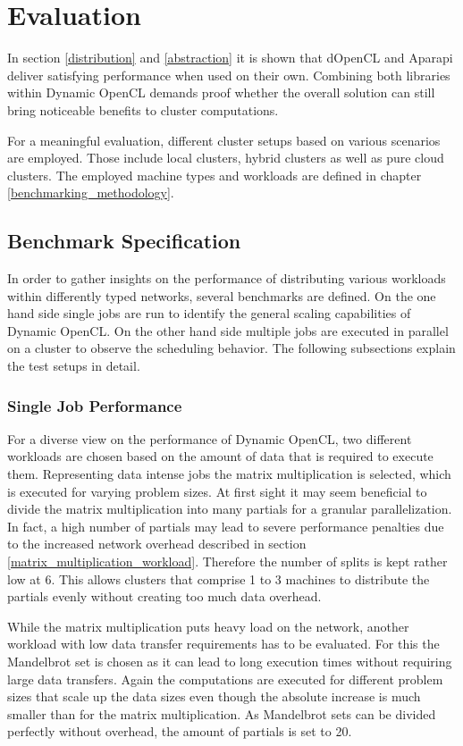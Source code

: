 \chapter{Evaluation}
\label{evaluation}
In section \ref{distribution} and \ref{abstraction} it is shown that dOpenCL and Aparapi deliver satisfying performance when used on their own. Combining both libraries within Dynamic OpenCL demands proof whether the overall solution can still bring noticeable benefits to cluster computations.

For a meaningful evaluation, different cluster setups based on various scenarios are employed. Those include local clusters, hybrid clusters as well as pure cloud clusters. The employed machine types and workloads are defined in chapter \ref{benchmarking_methodology}.

\section{Benchmark Specification}

In order to gather insights on the performance of distributing various workloads within differently typed networks, several benchmarks are defined. On the one hand side single jobs are run to identify the general scaling capabilities of Dynamic OpenCL. On the other hand side multiple jobs are executed in parallel on a cluster to observe the scheduling behavior. The following subsections explain the test setups in detail.

\subsection{Single Job Performance}

For a diverse view on the performance of Dynamic OpenCL, two different workloads are chosen based on the amount of data that is required to execute them. Representing data intense jobs the matrix multiplication is selected, which is executed for varying problem sizes. At first sight it may seem beneficial to divide the matrix multiplication into many partials for a granular parallelization. In fact, a high number of partials may lead to severe performance penalties due to the increased network overhead described in section \ref{matrix_multiplication_workload}. Therefore the number of splits is kept rather low at 6. This allows clusters that comprise 1 to 3 machines to distribute the partials evenly without creating too much data overhead.

While the matrix multiplication puts heavy load on the network, another workload with low data transfer requirements has to be evaluated. For this the Mandelbrot set is chosen as it can lead to long execution times without requiring large data transfers. Again the computations are executed for different problem sizes that scale up the data sizes even though the absolute increase is much smaller than for the matrix multiplication. As Mandelbrot sets can be divided perfectly without overhead, the amount of partials is set to 20.

